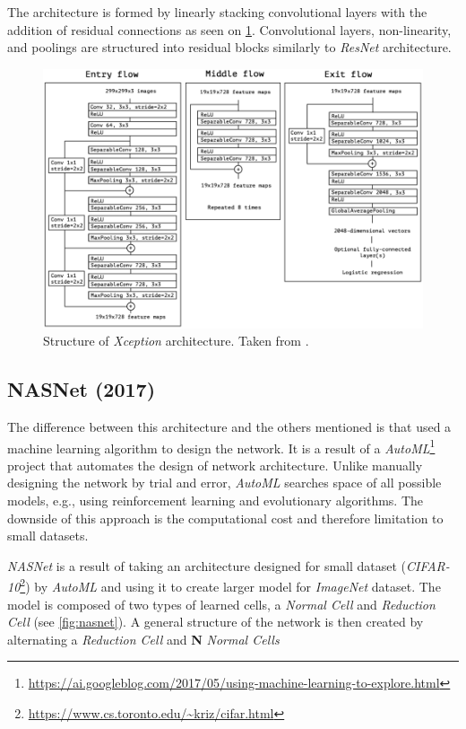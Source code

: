 The architecture is formed by linearly stacking convolutional layers with the addition of residual connections as seen on \cref{fig:xception}. Convolutional layers, non-linearity, and poolings are structured into residual blocks similarly to \textit{ResNet} architecture.

\begin{figure}
    \includegraphics[width=\textwidth]{img/xception}
    \caption{Structure of \textit{Xception} architecture. Taken from \cite[fig. 5]{bib:xception}.}
    \label{fig:xception}
\end{figure}


\subsection{NASNet (2017)}
\label{sec:nasnet}
The difference between this architecture and the others mentioned is that \citeauthor{bib:nasnet} \cite{bib:nasnet} used a machine learning algorithm to design the network. It is a result of a \textit{AutoML}\footnote{\url{https://ai.googleblog.com/2017/05/using-machine-learning-to-explore.html}} project that automates the design of network architecture. Unlike manually designing the network by trial and error, \textit{AutoML} searches space of all possible models, e.g., using reinforcement learning and evolutionary algorithms. The downside of this approach is the computational cost and therefore limitation to small datasets.

\textit{NASNet} is a result of taking an architecture designed for small dataset (\textit{CIFAR-10}\footnote{\url{https://www.cs.toronto.edu/~kriz/cifar.html}}) by \textit{AutoML} and using it to create larger model for \textit{ImageNet} dataset. The model is composed of two types of learned cells, a \textit{Normal Cell} and \textit{Reduction Cell} (see \cref{fig:nasnet}). A general structure of the network is then created by alternating a \textit{Reduction Cell} and \textbf{N} \textit{Normal Cells}

